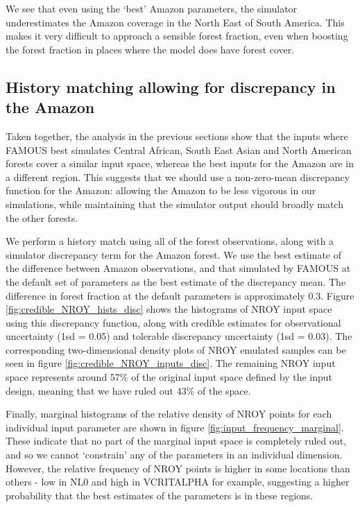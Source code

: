 \documentclass[esd, manuscript]{copernicus}
\begin{document}
We see that even using the `best' Amazon parameters, the simulator underestimates the Amazon coverage in the North East of South America. This makes it very difficult to approach a sensible forest fraction, even when boosting the forest fraction in places where the model does have forest cover.

\subsection{History matching allowing for discrepancy in the Amazon}\label{ssec:hist_disc}

Taken together, the analysis in the previous sections show that the inputs where FAMOUS best simulates Central African, South East Asian and North American forests cover a similar input space, whereas the best inputs for the Amazon are in a different region. This suggests that we should use a non-zero-mean discrepancy function for the Amazon: allowing the Amazon to be less vigorous in our simulations, while maintaining that the simulator output should broadly match the other forests.

We perform a history match using all of the forest observations, along with a simulator discrepancy term for the Amazon forest. We use the best estimate of the difference between Amazon observations, and that simulated by FAMOUS at the default set of parameters as the best estimate of the discrepancy mean. The difference in forest fraction at the default parameters is approximately 0.3. Figure \ref{fig:credible_NROY_hists_disc} shows the histograms of NROY input space using this discrepancy function, along with credible estimates for observational uncertainty (1sd = 0.05) and tolerable discrepancy uncertainty (1sd = 0.03). The corresponding two-dimensional density plots of NROY emulated samples can be seen in figure \ref{fig:credible_NROY_inputs_disc}. The remaining NROY input space represents around 57\% of the original input space defined by the input design, meaning that we have ruled out 43\% of the space.

Finally, marginal histograms of the relative density of NROY points for each individual input parameter are shown in figure \ref{fig:input_frequency_marginal}. These indicate that no part of the marginal input space is completely ruled out, and so we cannot `constrain' any of the parameters in an individual dimension. However, the relative frequency of NROY points is higher in some locations than others - low in NL0 and high in VCRITALPHA for example, suggesting a higher probability that the best estimates of the parameters is in these regions.
\end{document}
